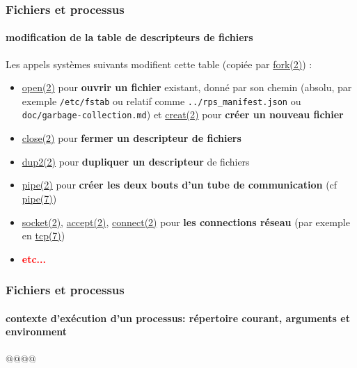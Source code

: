 \documentclass[xcolor=svgnames,final,smaller,a4]{beamer}
\begin{document}
\begin{frame}
  \frametitle{Fichiers et processus}
  \framesubtitle{modification de la table de descripteurs de fichiers}


  
  Les appels systèmes suivants modifient cette table (copiée par
  \href{https://man7.org/linux/man-pages/man2/fork.2.html}{fork(2)}) :

  \begin{itemize}
    \item 
  \href{https://man7.org/linux/man-pages/man2/open.2.html}{open(2)} pour \textbf{ouvrir un fichier} existant, donné par son chemin (absolu, par exemple \texttt{/etc/fstab} ou relatif comme \texttt{../rps\_manifest.json} ou \texttt{doc/garbage-collection.md}) et 
  \href{https://man7.org/linux/man-pages/man2/creat.2.html}{creat(2)} pour  \textbf{créer un nouveau fichier}

  \item 
  \href{https://man7.org/linux/man-pages/man2/close.2.html}{close(2)} pour  \textbf{fermer un descripteur de fichiers}

\item
  \href{https://man7.org/linux/man-pages/man2/dup2.2.html}{dup2(2)}
  pour  \textbf{dupliquer un descripteur} de fichiers

\item 
  \href{https://man7.org/linux/man-pages/man2/pipe.2.html}{pipe(2)}
  pour  \textbf{créer les deux bouts d'un tube de communication} (cf
  \href{https://man7.org/linux/man-pages/man7/pipe.7.html}{pipe(7)})
  
    \item 
  \href{https://man7.org/linux/man-pages/man2/socket.2.html}{socket(2)},
  \href{https://man7.org/linux/man-pages/man2/accept.2.html}{accept(2)},
  \href{https://man7.org/linux/man-pages/man2/accept.2.html}{connect(2)} pour  \textbf{les connections réseau} (par exemple en
  \href{https://man7.org/linux/man-pages/man7/tcp.7.html}{tcp(7)})
    \item \textbf{\textcolor{red}{etc...}}
  \end{itemize}

    
\end{frame}

\begin{frame}
  \frametitle{Fichiers et processus}
  \framesubtitle{contexte d'exécution d'un processus: répertoire courant, arguments et environment}

  @@@@
\end{frame}
\end{document}
